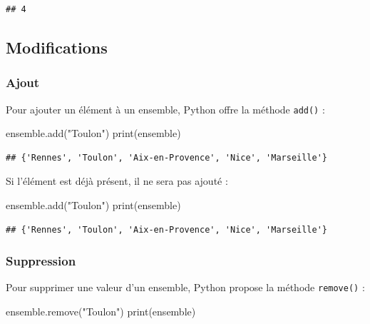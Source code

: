 \documentclass[
  12pt,
]{book}
\newenvironment{Shaded}{\begin{snugshade}}{\end{snugshade}}
\newcommand{\BuiltInTok}[1]{#1}
\newcommand{\NormalTok}[1]{#1}
\newcommand{\StringTok}[1]{\textcolor[rgb]{0.31,0.60,0.02}{#1}}
\numberwithin{equation}{section}
\numberwithin{countremarque}{section}
\begin{document}
\begin{lstlisting}
## 4
\end{lstlisting}

\subsection{Modifications}\label{modifications}

\subsubsection{Ajout}\label{ajout}

Pour ajouter un élément à un ensemble, Python offre la méthode \texttt{add()} :

\begin{Shaded}
\begin{Highlighting}[]
\NormalTok{ensemble.add(}\StringTok{"Toulon"}\NormalTok{)}
\BuiltInTok{print}\NormalTok{(ensemble)}
\end{Highlighting}
\end{Shaded}

\begin{lstlisting}
## {'Rennes', 'Toulon', 'Aix-en-Provence', 'Nice', 'Marseille'}
\end{lstlisting}

Si l'élément est déjà présent, il ne sera pas ajouté :

\begin{Shaded}
\begin{Highlighting}[]
\NormalTok{ensemble.add(}\StringTok{"Toulon"}\NormalTok{)}
\BuiltInTok{print}\NormalTok{(ensemble)}
\end{Highlighting}
\end{Shaded}

\begin{lstlisting}
## {'Rennes', 'Toulon', 'Aix-en-Provence', 'Nice', 'Marseille'}
\end{lstlisting}

\subsubsection{Suppression}\label{suppression}

Pour supprimer une valeur d'un ensemble, Python propose la méthode \texttt{remove()} :

\begin{Shaded}
\begin{Highlighting}[]
\NormalTok{ensemble.remove(}\StringTok{"Toulon"}\NormalTok{)}
\BuiltInTok{print}\NormalTok{(ensemble)}
\end{Highlighting}
\end{Shaded}
\end{document}
